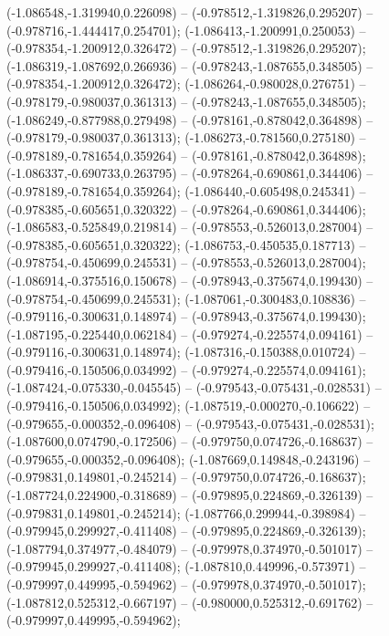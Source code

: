  (-1.086548,-1.319940,0.226098) -- (-0.978512,-1.319826,0.295207) -- (-0.978716,-1.444417,0.254701);
 (-1.086413,-1.200991,0.250053) -- (-0.978354,-1.200912,0.326472) -- (-0.978512,-1.319826,0.295207);
 (-1.086319,-1.087692,0.266936) -- (-0.978243,-1.087655,0.348505) -- (-0.978354,-1.200912,0.326472);
 (-1.086264,-0.980028,0.276751) -- (-0.978179,-0.980037,0.361313) -- (-0.978243,-1.087655,0.348505);
 (-1.086249,-0.877988,0.279498) -- (-0.978161,-0.878042,0.364898) -- (-0.978179,-0.980037,0.361313);
 (-1.086273,-0.781560,0.275180) -- (-0.978189,-0.781654,0.359264) -- (-0.978161,-0.878042,0.364898);
 (-1.086337,-0.690733,0.263795) -- (-0.978264,-0.690861,0.344406) -- (-0.978189,-0.781654,0.359264);
 (-1.086440,-0.605498,0.245341) -- (-0.978385,-0.605651,0.320322) -- (-0.978264,-0.690861,0.344406);
 (-1.086583,-0.525849,0.219814) -- (-0.978553,-0.526013,0.287004) -- (-0.978385,-0.605651,0.320322);
 (-1.086753,-0.450535,0.187713) -- (-0.978754,-0.450699,0.245531) -- (-0.978553,-0.526013,0.287004);
 (-1.086914,-0.375516,0.150678) -- (-0.978943,-0.375674,0.199430) -- (-0.978754,-0.450699,0.245531);
 (-1.087061,-0.300483,0.108836) -- (-0.979116,-0.300631,0.148974) -- (-0.978943,-0.375674,0.199430);
 (-1.087195,-0.225440,0.062184) -- (-0.979274,-0.225574,0.094161) -- (-0.979116,-0.300631,0.148974);
 (-1.087316,-0.150388,0.010724) -- (-0.979416,-0.150506,0.034992) -- (-0.979274,-0.225574,0.094161);
 (-1.087424,-0.075330,-0.045545) -- (-0.979543,-0.075431,-0.028531) -- (-0.979416,-0.150506,0.034992);
 (-1.087519,-0.000270,-0.106622) -- (-0.979655,-0.000352,-0.096408) -- (-0.979543,-0.075431,-0.028531);
 (-1.087600,0.074790,-0.172506) -- (-0.979750,0.074726,-0.168637) -- (-0.979655,-0.000352,-0.096408);
 (-1.087669,0.149848,-0.243196) -- (-0.979831,0.149801,-0.245214) -- (-0.979750,0.074726,-0.168637);
 (-1.087724,0.224900,-0.318689) -- (-0.979895,0.224869,-0.326139) -- (-0.979831,0.149801,-0.245214);
 (-1.087766,0.299944,-0.398984) -- (-0.979945,0.299927,-0.411408) -- (-0.979895,0.224869,-0.326139);
 (-1.087794,0.374977,-0.484079) -- (-0.979978,0.374970,-0.501017) -- (-0.979945,0.299927,-0.411408);
 (-1.087810,0.449996,-0.573971) -- (-0.979997,0.449995,-0.594962) -- (-0.979978,0.374970,-0.501017);
 (-1.087812,0.525312,-0.667197) -- (-0.980000,0.525312,-0.691762) -- (-0.979997,0.449995,-0.594962);
